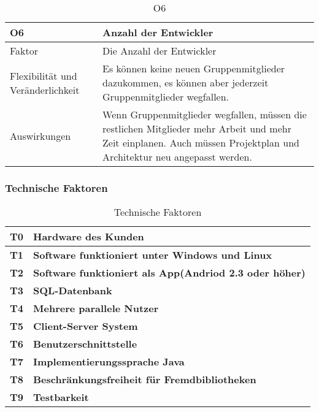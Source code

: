 \begin{table}[H]
\caption{O6}
\begin{tabular}{|p{3cm}|p{12cm}|}\hline
\textbf{O6} & \textbf{Anzahl der Entwickler}\\ \hline \hline
Faktor & Die Anzahl der Entwickler\\ \hline
Flexibilität und Veränderlichkeit & Es können keine neuen Gruppenmitglieder dazukommen, es können aber jederzeit Gruppenmitglieder wegfallen. \\ \hline
Auswirkungen & Wenn Gruppenmitglieder wegfallen, müssen die restlichen Mitglieder mehr Arbeit und mehr Zeit einplanen. Auch müssen Projektplan und Architektur neu angepasst werden.\\ \hline
\end{tabular}
\end{table}


\subsubsection{Technische Faktoren}
\label{sec:techfaktoren}

\begin{table}[H]
\centering
\caption{Technische Faktoren}
\begin{tabular}{|l|l|} \hline
\textbf{T0} &  \textbf{Hardware des Kunden}\\ \hline
\textbf{T1} & \textbf{Software funktioniert unter Windows und Linux} \\ \hline
\textbf{T2} & \textbf{Software funktioniert als App(Andriod 2.3 oder höher)}\\ \hline
\textbf{T3} & \textbf{SQL-Datenbank} \\ \hline
\textbf{T4} & \textbf{Mehrere parallele Nutzer} \\ \hline
\textbf{T5} & \textbf{Client-Server System} \\ \hline
\textbf{T6} & \textbf{Benutzerschnittstelle} \\ \hline
\textbf{T7} & \textbf{Implementierungssprache Java} \\ \hline
\textbf{T8} &  \textbf{Beschränkungsfreiheit für Fremdbibliotheken}\\ \hline
\textbf{T9} &  \textbf{Testbarkeit}\\ \hline
\end{tabular}
\end{table}

